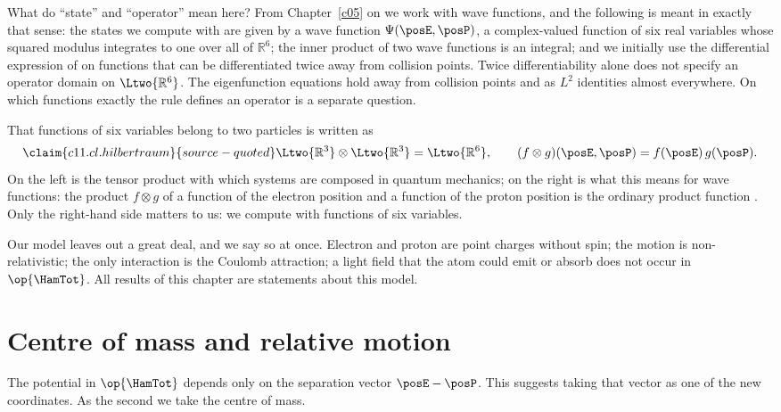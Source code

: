 What do “state” and “operator” mean here? From Chapter~\ref{c05} on we work with wave
functions, and the following is meant in exactly that sense: the states we compute with
are given by a wave function $\Psi(\posE, \posP)$, a complex-valued function of six real
variables whose squared modulus integrates to one over all of $\mathbb{R}^6$; the inner
product of two wave functions is an integral; and we initially use the differential
expression of  on functions that can be differentiated twice away from
collision points. Twice differentiability alone does not specify an operator domain on
$\Ltwo{\mathbb{R}^6}$. The eigenfunction equations hold away from collision points and
as $L^2$ identities almost everywhere. On which functions exactly the rule defines an
operator is a separate question.

That functions of six variables belong to two particles is written as
\begin{equation}\label{c11.eq.hilbertraum}\claim{c11.cl.hilbertraum}{source-quoted}
  \Ltwo{\mathbb{R}^3} \otimes \Ltwo{\mathbb{R}^3} = \Ltwo{\mathbb{R}^6},
  \qquad
  (f \otimes g)(\posE, \posP) = f(\posE)\, g(\posP).
\end{equation}
On the left is the tensor product with which systems are composed in quantum mechanics;
on the right is what this means for wave functions: the product $f \otimes g$ of a
function of the electron position and a function of the proton position is the ordinary
product function . Only the right-hand
side matters to us: we compute with functions of six variables.

Our model leaves out a great deal, and we say so at once. Electron and proton are point
charges without spin; the motion is non-relativistic; the only interaction is the Coulomb
attraction; a light field that the atom could emit or absorb does not occur in $\op{\HamTot}$.
All results of this chapter are statements about this model.

\section{Centre of mass and relative motion}\label{c11.s2}

The potential in $\op{\HamTot}$ depends only on the separation vector $\posE - \posP$. This
suggests taking that vector as one of the new coordinates. As the second we take the
centre of mass.

